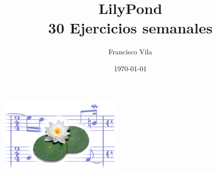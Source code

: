 \documentclass[a4paper,10pt,oneside,headinclude,titlepage]{article} %
\title{LilyPond\\30 Ejercicios semanales}
\author{Francisco Vila}
\date{\today}
\begin{document}
\nonfrenchspacing

\begin{titlepage} %
  \makeatletter
  \begin{center}
    \vfill
    \includegraphics[width=60mm]{lily-logo.png}\par
    \vfill
    \textbf{\huge\@title}\par
    {\@date}
    \vfill
    \textbf{\large\@author}
    \vfill
  \end{center}
  \makeatother
\end{titlepage}


\begin{singlespace} %
  \tableofcontents
\end{singlespace}
 
 
 
 
 
 
 
 
 
 
 
 
 
 
 
 
 
 
 
 
 
 
 
 
 
 
 
 
 
 
 
 
 
\end{document}
